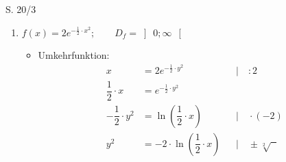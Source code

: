 \begin{Exercise}{S. 20/3}{}
\begin{enumerate}
\begin{enumerate}[label=\alph*)]
{\begin{itemize}[leftmargin=*]
{                        \begin{align*}
                            \left(f^{-1}(x)\right)' &= \dfrac{\left(-x +1\right) \cdot 0 - 1 \cdot (-1)}{\left(-x + 1\right)^{2}}&&\\[1.5ex]
                            &= \dfrac{1}{\left(-x + 1\right)^{2}} &&
                        \end{align*}
                        }
                    \item Umkehrregel: \\[-2.0ex]{
                        \begin{align*}
                            f'(x) &= \dfrac{1}{x^2} &&
                        \end{align*}\\[-2.0ex]
                        \begin{align*}
                            \left(f^{-1}(x)\right)' &= \dfrac{1}{f'(f^{-1}(x))} && \\[2.0ex]
                            &= \dfrac{1}{\left[\dfrac{1}{\left(\dfrac{1}{-x + 1}\right)^2}\right]} &&\\[2.0ex]
                            &= \left(\dfrac{1}{-x + 1}\right)^2 &&\\[2.0ex]
                            &= \dfrac{1}{\left(-x + 1\right)^2} &&
                        \end{align*}
                        }
                \end{itemize}
                }
            \item[d)] {
                $f(x) = 2 e^{-\frac{1}{2}\cdot x^2}; \qquad D_{f} = \left] \ 0; \infty \ \right[$\\[-2.0ex]
                \begin{itemize}[leftmargin=*]
                    \item Umkehrfunktion: \\{
                        \vspace{-2.0ex}
                        \begin{align*}
                            x &= 2 e^{-\frac{1}{2} \cdot y^2} && | \quad :2\\[1.5ex]
                            \dfrac{1}{2} \cdot x &= e^{-\frac{1}{2} \cdot y^2} &&\\[1.5ex]
                            -\dfrac{1}{2} \cdot y^2 &= \ln(\dfrac{1}{2} \cdot x) &&| \quad \cdot (-2)\\[1.5ex]
                            y^2 &= -2 \cdot \ln(\dfrac{1}{2} \cdot x) &&| \quad \pm \sqrt[2]{\phantom{x}}\\[1.5ex]

\end{align*}}
\end{itemize}}
\end{enumerate}
\end{enumerate}
\end{Exercise}
